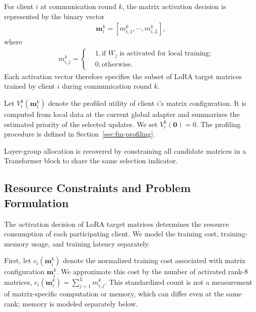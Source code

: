 \documentclass[10pt,conference,letterpaper]{IEEEtran}
\begin{document}
For client $i$ at communication round $k$, the matrix activation
decision is represented by the binary vector
\begin{eqnarray}
\mathbf m^k_i=[{m}_{i,1}^k,\cdots,{m}_{i,L}^k],
\end{eqnarray}
where
\begin{eqnarray}
&&{m}_{i,j}^k= \left\{
\begin{aligned}
&1,\mbox{if $W_j$ is activated for local training};\\
&0,\mbox{otherwise.}
\end{aligned}
\right.
\end{eqnarray}Each activation vector therefore specifies the subset of LoRA target matrices trained by client $i$ during communication round $k$.

Let $V_i^k(\mathbf m_i^k)$ denote the profiled utility of client $i$'s matrix configuration. It is computed from local data at the current global adapter and summarizes the estimated priority of the selected updates. We set $V_i^k(\mathbf 0)=0$. The profiling procedure is defined in Section~\ref{sec:fm-profiling}.

Layer-group allocation is recovered by constraining all candidate matrices in a Transformer block to share the same selection indicator.

\subsection{Resource Constraints and Problem Formulation}
The activation decision of LoRA target matrices determines the resource consumption of each participating client. We model the training cost, training-memory usage, and training latency separately.

First, let $c_i(\mathbf m^k_i)$ denote the normalized training cost associated with matrix configuration $\mathbf m^k_i$. We approximate this cost by the number of activated rank-8 matrices, $c_i(\mathbf m^k_i)=\sum_{j=1}^{L}m_{i,j}^k$. This standardized count is not a measurement of matrix-specific computation or memory, which can differ even at the same rank; memory is modeled separately below.
\end{document}
